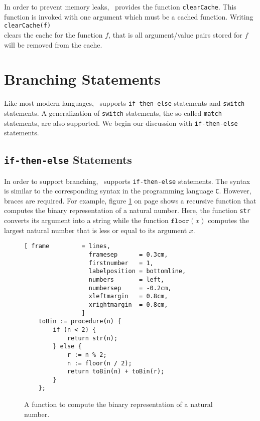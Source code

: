 In order to prevent memory leaks, \setlx\ provides the function \texttt{clearCache}.  This
function is invoked with one argument which must be a cached function.  Writing
\\[0.2cm]
\hspace*{1.3cm}
\texttt{clearCache(f)}
\\[0.2cm]
clears the cache for the function $f$, that is all argument/value pairs stored for $f$
will be removed from the cache.


\section{Branching Statements}
Like most modern languages, \setlx\ supports \texttt{if-then-else} statements and
\texttt{switch} statements.  A generalization of \texttt{switch} statements, the so called
\texttt{match} statements, are also supported. We begin our discussion with
\texttt{if-then-else} statements.

\subsection{\texttt{if-then-else} Statements}
In order to support branching, \setlx\ supports \texttt{if-then-else} statements.  The syntax is 
similar to the corresponding syntax in the programming language \texttt{C}.  However, braces are
required.  For example, figure \ref{fig:toBin.stlx} on page \pageref{fig:toBin.stlx} shows a
recursive function that computes the binary representation of a
natural number.  Here, the function \texttt{str} converts its argument
into a string while the function $\texttt{floor}(x)$ computes the largest
natural number that is less or equal to its argument $x$.

\begin{figure}[!ht]
\centering
\begin{Verbatim}[ frame         = lines, 
                  framesep      = 0.3cm, 
                  firstnumber   = 1,
                  labelposition = bottomline,
                  numbers       = left,
                  numbersep     = -0.2cm,
                  xleftmargin   = 0.8cm,
                  xrightmargin  = 0.8cm,
                ]
    toBin := procedure(n) {
        if (n < 2) {
            return str(n);
        } else {
            r := n % 2;
            n := floor(n / 2);
            return toBin(n) + toBin(r);
        }
    };
\end{Verbatim}
\vspace*{-0.3cm}
\caption{A function to compute the binary representation of a natural number.}
\label{fig:toBin.stlx}
\end{figure}

